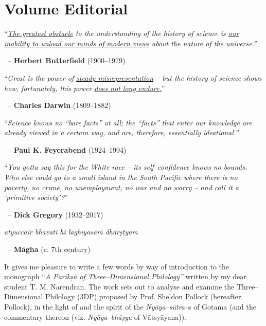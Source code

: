 
\chapter*{Volume Editorial}\label{volumeeditorial}

\begin{myquote}
“\textit{\underline{The greatest obstacle} to the understanding of the history of science is \underline{our inability to unload our minds of modern views} about the nature of the universe.}”
\end{myquote}


~\hfill – \textbf{Herbert Butterfield} (1900–1979)

\begin{myquote}
“\textit{Great is the power of \underline{steady misrepresentation} – but the history of science shows how, fortunately, this power \underline{does not long endure.}}”
\end{myquote}


~\hfill – \textbf{Charles Darwin} (1809–1882)

\begin{myquote}
“\textit{Science knows no “bare facts” at all; the “facts” that enter our knowledge are already viewed in a certain way, and are, therefore, essentially ideational.}”
\end{myquote}


~\hfill – \textbf{Paul K. Feyerabend }(1924–1994)

\begin{myquote}
“\textit{You gotta say this for the White race – its self–confidence knows no bounds. Who else could go to a small island in the South Pacific where there is no poverty, no crime, no unemployment, no war and no worry – and call it a ‘primitive society’?}”
\end{myquote}


~\hfill – \textbf{Dick Gregory }(1932–2017)

\begin{myquote}
\textit{atyuccair bhavati hi laghīyasāṁ dhārṣṭyam}
\end{myquote}


~\hfill – \textbf{Māgha} (c. 7th century)

It gives me pleasure to write a few words by way of introduction to the monograph “\textit{A Parīkṣā of Three–Dimensional Philology”} written by my dear student T. M. Narendran. The work sets out to analyse and examine the Three–Dimensional Philology (3DP) proposed by Prof. Sheldon Pollock (hereafter Pollock), in the light of and the spirit of the \textit{Nyāya–sūtra}–s of Gotama (and the commentary thereon (viz. \textit{Nyāya–bhāṣya} of Vātsyāyana)).

